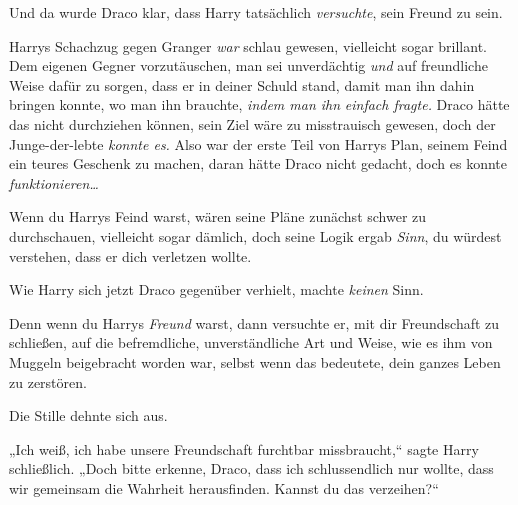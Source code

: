 Und da wurde Draco klar, dass Harry tatsächlich \emph{versuchte}, sein Freund zu sein.

Harrys Schachzug gegen Granger \emph{war} schlau gewesen, vielleicht sogar brillant. Dem eigenen Gegner vorzutäuschen, man sei unverdächtig \emph{und} auf freundliche Weise dafür zu sorgen, dass er in deiner Schuld stand, damit man ihn dahin bringen konnte, wo man ihn brauchte, \emph{indem man ihn} \emph{einfach fragte.} Draco hätte das nicht durchziehen können, sein Ziel wäre zu misstrauisch gewesen, doch der Junge-der-lebte \emph{konnte es.} Also war der erste Teil von Harrys Plan, seinem Feind ein teures Geschenk zu machen, daran hätte Draco nicht gedacht, doch es konnte \emph{funktionieren…}

Wenn du Harrys Feind warst, wären seine Pläne zunächst schwer zu durchschauen, vielleicht sogar dämlich, doch seine Logik ergab \emph{Sinn}, du würdest verstehen, dass er dich verletzen wollte.

Wie Harry sich jetzt Draco gegenüber verhielt, machte \emph{keinen} Sinn.

Denn wenn du Harrys \emph{Freund} warst, dann versuchte er, mit dir Freundschaft zu schließen, auf die befremdliche, unverständliche Art und Weise, wie es ihm von Muggeln beigebracht worden war, selbst wenn das bedeutete, dein ganzes Leben zu zerstören.

Die Stille dehnte sich aus.

„Ich weiß, ich habe unsere Freundschaft furchtbar missbraucht,“ sagte Harry schließlich. „Doch bitte erkenne, Draco, dass ich schlussendlich nur wollte, dass wir gemeinsam die Wahrheit herausfinden. Kannst du das verzeihen?“

